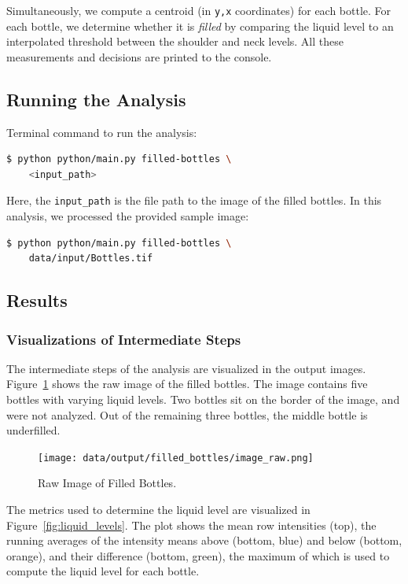 \documentclass[a4paper,12pt]{article}
\begin{document}
Simultaneously, we compute a centroid (in \texttt{y,x} coordinates) for each bottle. For each bottle, we determine whether it is \emph{filled} by comparing the liquid level to an interpolated threshold between the shoulder and neck levels. All these measurements and decisions are printed to the console.

\subsection{Running the Analysis}

Terminal command to run the analysis:

\begin{lstlisting}[language=bash]
$ python python/main.py filled-bottles \
    <input_path>
\end{lstlisting}

Here, the \texttt{input\_path} is the file path to the image of the filled bottles. In this analysis, we processed the provided sample image:

\begin{lstlisting}[language=bash]
$ python python/main.py filled-bottles \
    data/input/Bottles.tif
\end{lstlisting}

\subsection{Results}

\subsubsection{Visualizations of Intermediate Steps}

The intermediate steps of the analysis are visualized in the output images. Figure~\ref{fig:bottle_raw} shows the raw image of the filled bottles. The image contains five bottles with varying liquid levels. Two bottles sit on the border of the image, and were not analyzed. Out of the remaining three bottles, the middle bottle is underfilled.

\begin{figure}[!htbp]
    \centering
    \texttt{[image: data/output/filled\_bottles/image\_raw.png]}
    \caption{Raw Image of Filled Bottles.}
    \label{fig:bottle_raw}
\end{figure}

The metrics used to determine the liquid level are visualized in Figure~\ref{fig:liquid_levels}. The plot shows the mean row intensities (top), the running averages of the intensity means above (bottom, blue) and below (bottom, orange), and their difference (bottom, green), the maximum of which is used to compute the liquid level for each bottle.
\end{document}

